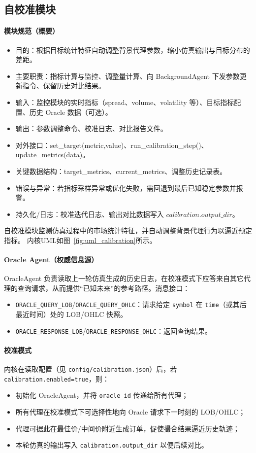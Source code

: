 \subsection{自校准模块}

\paragraph{模块规范（概要）}
\begin{itemize}
  \item 目的：根据目标统计特征自动调整背景代理参数，缩小仿真输出与目标分布的差距。
  \item 主要职责：指标计算与监控、调整量计算、向 BackgroundAgent 下发参数更新指令、保留历史对比结果。
  \item 输入：监控模块的实时指标（spread、volume、volatility 等）、目标指标配置、历史 Oracle 数据（可选）。
  \item 输出：参数调整命令、校准日志、对比报告文件。
  \item 对外接口：set\_target(metric,value)、run\_calibration\_step()、update\_metrics(data)。
  \item 关键数据结构：target\_metrics、current\_metrics、调整历史记录表。
  \item 错误与异常：若指标采样异常或优化失败，需回退到最后已知稳定参数并报警。
  \item 持久化/日志：校准迭代日志、输出对比数据写入 $calibration.output\_dir$。
\end{itemize}

自校准模块监测仿真过程中的市场统计特征，并自动调整背景代理行为以逼近预定指标。
内核UML如图~\ref{fig:uml_calibration}所示。

\paragraph{Oracle Agent（权威信息源）}
OracleAgent 负责读取上一轮仿真生成的历史日志，在校准模式下应答来自其它代理的查询请求，从而提供“已知未来”的参考路径。消息接口：
\begin{itemize}
  \item \verb|ORACLE_QUERY_LOB|/\verb|ORACLE_QUERY_OHLC|：请求给定 \verb|symbol| 在 \verb|time|（或其后最近时间）处的 LOB/OHLC 快照。
  \item \verb|ORACLE_RESPONSE_LOB|/\verb|ORACLE_RESPONSE_OHLC|：返回查询结果。
\end{itemize}

\paragraph{校准模式}
内核在读取配置（见 \verb|config/calibration.json|）后，若 \verb|calibration.enabled=true|，则：
\begin{itemize}
  \item 初始化 OracleAgent，并将 \verb|oracle_id| 传递给所有代理；
  \item 所有代理在校准模式下可选择性地向 Oracle 请求下一时刻的 LOB/OHLC；
  \item 代理可据此在最佳价/中间价附近生成订单，促使撮合结果逼近历史轨迹；
  \item 本轮仿真的输出写入 \verb|calibration.output_dir| 以便后续对比。
\end{itemize}

